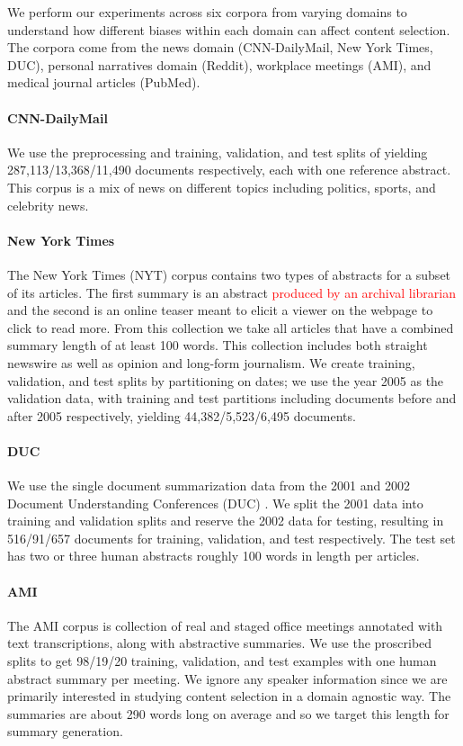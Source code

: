 We perform our experiments across six corpora from varying domains to 
understand how different biases within each domain can affect content 
selection. The corpora come from the news domain
(CNN-DailyMail, New York Times, DUC), personal narratives domain (Reddit),
workplace meetings (AMI), and medical journal articles (PubMed).

\paragraph{CNN-DailyMail} We use the preprocessing and training, validation, 
and test splits
of \cite{see2017get} yielding 287,113/13,368/11,490 documents respectively, each with one reference
abstract. This corpus is a mix of news on different topics including politics,
sports, and celebrity news.

\paragraph{New York Times}{The New York Times (NYT) corpus \cite{sandhaus2008new} contains
 two types of abstracts for a subset of its articles. The first summary is
an abstract \textcolor{red}{produced by an archival librarian} and the 
second is an online teaser meant to elicit a viewer on the webpage to
click to read more. From this collection we take all articles that have 
a combined summary length of at least 100 words. This collection
includes both straight newswire as well as opinion and long-form journalism.
We create training, validation, and test splits by partitioning on dates;
we use the year 2005 as the validation data, with training and test partitions
including documents before and after 2005 respectively,
yielding 44,382/5,523/6,495 documents.}

\paragraph{DUC}{We use the single document summarization data from the 2001
and 2002
Document Understanding Conferences (DUC) \cite{over2002introduction}. We split the 2001 data into training
and validation splits and reserve the 2002 data for testing, resulting in
516/91/657 documents for training, validation, and test respectively. 
The test set has two or three human abstracts roughly 100 words in length per 
articles.}

\paragraph{AMI}{The AMI corpus \cite{carletta2005ami} 
is collection of real and staged office meetings
annotated with text transcriptions, along with abstractive
summaries. We use the proscribed splits to get 98/19/20 training, validation,
and test examples with one human abstract summary per meeting. 
We ignore any speaker information since we are primarily
interested in studying content selection in a domain agnostic way.
The summaries are about 290 words long on average and so we target this length
for summary generation.
}

